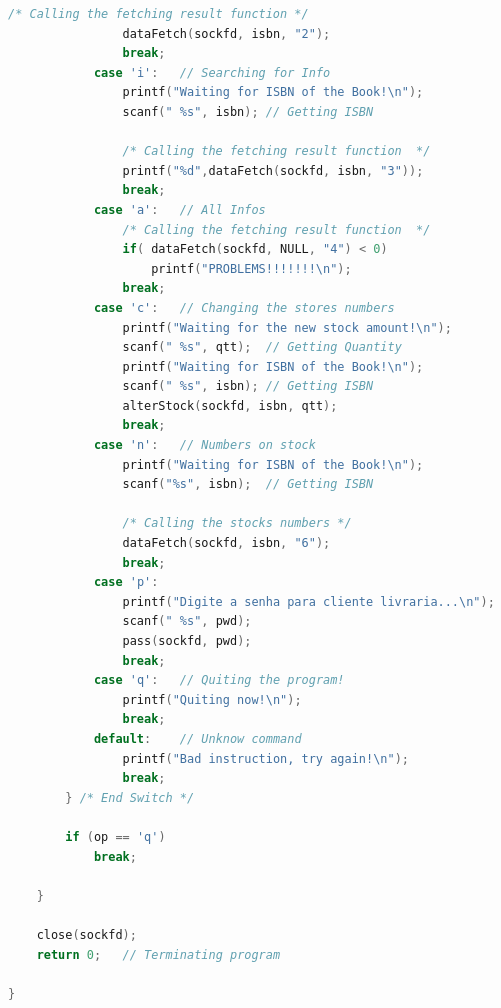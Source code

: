 \documentclass[10pt,a4paper]{report}
\begin{document}
\begin{lstlisting}[language=C]
				/* Calling the fetching result function */ 
				dataFetch(sockfd, isbn, "2"); 
				break; 
			case 'i':	// Searching for Info 
				printf("Waiting for ISBN of the Book!\n"); 
				scanf(" %s", isbn);	// Getting ISBN 

				/* Calling the fetching result function  */ 
				printf("%d",dataFetch(sockfd, isbn, "3")); 
				break; 
			case 'a':	// All Infos 
				/* Calling the fetching result function  */ 
				if( dataFetch(sockfd, NULL, "4") < 0) 
					printf("PROBLEMS!!!!!!!\n"); 
				break; 
			case 'c':	// Changing the stores numbers 
				printf("Waiting for the new stock amount!\n"); 
				scanf(" %s", qtt);	// Getting Quantity 
				printf("Waiting for ISBN of the Book!\n"); 
				scanf(" %s", isbn);	// Getting ISBN 
				alterStock(sockfd, isbn, qtt); 
				break; 
			case 'n':	// Numbers on stock 
				printf("Waiting for ISBN of the Book!\n"); 
				scanf("%s", isbn);	// Getting ISBN 

				/* Calling the stocks numbers */ 
				dataFetch(sockfd, isbn, "6"); 
				break; 
			case 'p': 
				printf("Digite a senha para cliente livraria...\n"); 
				scanf(" %s", pwd); 
				pass(sockfd, pwd); 
				break; 
			case 'q':	// Quiting the program! 
				printf("Quiting now!\n"); 
				break; 
			default:	// Unknow command 
				printf("Bad instruction, try again!\n"); 
				break; 
		} /* End Switch */ 

		if (op == 'q') 
			break; 

	} 
	 
	close(sockfd); 
	return 0;	// Terminating program 

}
\end{lstlisting}
\end{document}
